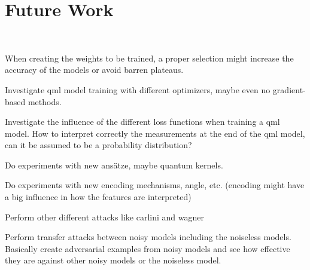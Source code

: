 \chapter{Future Work}\label{chapter:future_work} \

When creating the weights to be trained, a proper selection might increase the accuracy of the models or avoid barren plateaus. \

Investigate \ac{qml} model training with different optimizers, maybe even no gradient-based methods. \

Investigate the influence of the different loss functions when training a \ac{qml} model. How to interpret correctly the measurements at the end of the \ac{qml} model, can it be assumed to be a probability distribution? \

Do experiments with new ansätze, maybe quantum kernels. \

Do experiments with new encoding mechanisms, angle, etc. (encoding might have a big influence in how the features are interpreted) \

Perform other different attacks like carlini and wagner \

Perform transfer attacks between noisy models including the noiseless models. Basically create adversarial examples from noisy models and see how effective they are against other noisy models or the noiseless model. \


